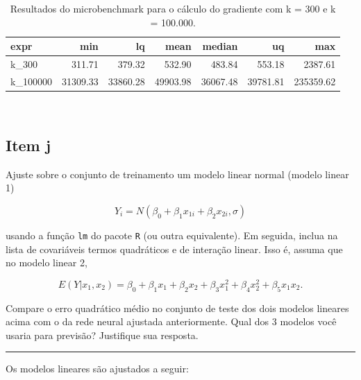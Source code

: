 \documentclass[
  a4paperpaper,
]{article}
\begin{document}
\begin{longtable}[]{@{}lrrrrrr@{}}

\caption{\label{tbl-microbenchmark}Resultados do microbenchmark para o
cálculo do gradiente com k = 300 e k = 100.000.}

\tabularnewline

\toprule\noalign{}
expr & min & lq & mean & median & uq & max \\
\midrule\noalign{}
\endhead
\bottomrule\noalign{}
\endlastfoot
k\_300 & 311.71 & 379.32 & 532.90 & 483.84 & 553.18 & 2387.61 \\
k\_100000 & 31309.33 & 33860.28 & 49903.98 & 36067.48 & 39781.81 &
235359.62 \\

\end{longtable}

~

\subsection{Item j}\label{item-j}

Ajuste sobre o conjunto de treinamento um modelo linear normal (modelo
linear 1)

\[
Y_i = N \left(\beta_0 + \beta_1 x_{1i} + \beta_2 x_{2i}, \sigma \right)
\]

usando a função \texttt{lm} do pacote \texttt{R} (ou outra equivalente).
Em seguida, inclua na lista de covariáveis termos quadráticos e de
interação linear. Isso é, assuma que no modelo linear 2,

\[
E(Y|x_1, x_2) = \beta_0 + \beta_1 x_{1} + \beta_2 x_{2} + \beta_3 x_1^2 + \beta_4 x_2^2 + \beta_5 x_1 x_2.
\]

Compare o erro quadrático médio no conjunto de teste dos dois modelos
lineares acima com o da rede neural ajustada anteriormente. Qual dos 3
modelos você usaria para previsão? Justifique sua resposta.

\begin{center}\rule{0.5\linewidth}{0.5pt}\end{center}

Os modelos lineares são ajustados a seguir:
\end{document}
